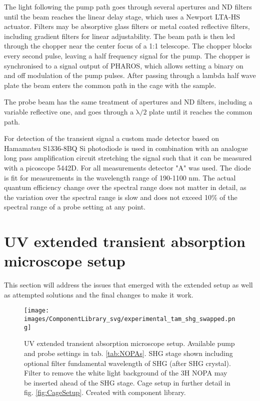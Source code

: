 \documentclass[twoside,openright,listof=numbered]{scrreprt}
\begin{document}
The light following the pump path goes through several apertures and ND filters until the beam reaches the linear delay stage, which uses a Newport LTA-HS actuator.  Filters may be absorptive glass filters or metal coated reflective filters, including gradient filters for linear adjustability.  The beam path is then led through the chopper near the center focus of a  1:1 telescope. The chopper blocks every second pulse, leaving a half frequency signal for the pump. The chopper is synchronised to a signal output of PHAROS, which allows setting a binary on and off modulation of the pump pulses. After passing through a lambda half wave plate the beam enters the common path in the cage with the sample.

The probe beam has the same treatment of apertures and ND filters, including a variable reflective one, and goes through a $\mathrm{\lambda/2}$ plate until it reaches the common path.


For detection of the transient signal a custom made detector based on Hamamatsu S1336-8BQ Si photodiode is used in combination with an analogue long pass amplification circuit stretching the signal such that it can be measured with a picoscope 5442D. For all measurements detector "A" was used. The diode is fit for measurements in the wavelength range of 190-1100 nm. The actual quantum efficiency change over the spectral range does not matter in detail, as the variation over the spectral range is slow and does not exceed 10\% of the spectral range of a probe setting at any point.

\section{UV extended transient absorption microscope setup}
This section will address the issues that emerged with the extended setup as well as attempted solutions and the final changes to make it work.

\begin{figure}[h]
\centering
\texttt{[image: images/ComponentLibrary\_svg/experimental\_tam\_shg\_swapped.png]}
\caption[UV extended transient absorption microscope setup.]{UV extended transient absorption microscope setup. Available pump and probe settings in tab. \ref{tab:NOPAs}.
SHG stage shown including optional filter fundamental wavelength of SHG (after SHG crystal). Filter to remove the white light background of the 3H NOPA may be inserted ahead of the SHG stage. Cage setup in further detail in fig. \ref{fig:CageSetup}. Created with component library.}
\end{figure}
\end{document}
